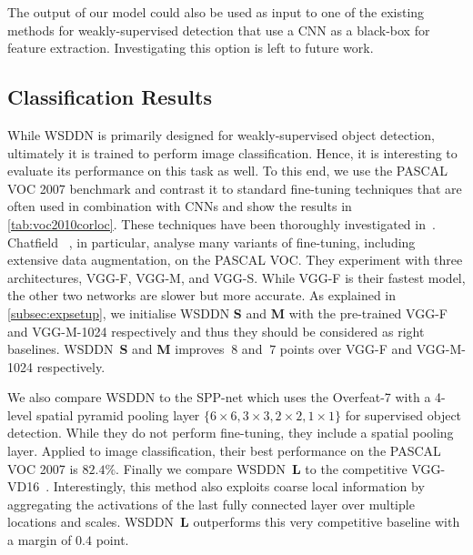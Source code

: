 The output of our model could also be used as input to one of the existing methods for weakly-supervised detection that use a CNN as a black-box for feature extraction. Investigating this option is left to future work.



\subsection{Classification Results}
While WSDDN is primarily designed for weakly-supervised object detection, ultimately it is trained to perform image classification. Hence, it is interesting to evaluate its performance on this task as well. To this end, we use the PASCAL VOC 2007 benchmark and contrast it to standard fine-tuning techniques that are often used in combination with CNNs and show the results in \cref{tab:voc2010corloc}. These techniques have been thoroughly investigated in~\cite{Chatfield14,He14,Oquab14}. Chatfield \etal~\cite{Chatfield14}, in particular, analyse many variants of fine-tuning, including extensive data augmentation, on the PASCAL VOC. They experiment with three architectures, VGG-F, VGG-M, and VGG-S. While VGG-F is their fastest model, the other two networks are slower but more accurate. As explained in \ref{subsec:expsetup}, we initialise WSDDN \textbf{S} and \textbf{M} with the pre-trained VGG-F and VGG-M-1024 respectively and thus they should be considered as right baselines. WSDDN~\textbf{S} and \textbf{M} improves $~8$ and $~7$ points over VGG-F and VGG-M-1024 respectively. 


We also compare WSDDN to the SPP-net \cite{He14} which uses the Overfeat-7 \cite{Sermanet13} with a 4-level spatial pyramid pooling layer $\{6\times 6, 3\times 3, 2\times 2, 1\times 1\}$ for supervised object detection. While they do not perform fine-tuning, they include a spatial pooling layer. Applied to image classification, their best performance on the PASCAL VOC 2007 is $82.4\%$. Finally we compare WSDDN~\textbf{L} to the competitive VGG-VD16~\cite{Simonyan15}. Interestingly, this method also exploits coarse local information by aggregating the activations of the last fully connected layer over multiple locations and scales. WSDDN~\textbf{L} outperforms this very competitive baseline with a margin of $0.4$ point.

